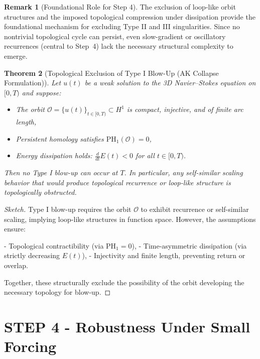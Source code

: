 \documentclass[11pt]{article}
\newtheorem{theorem}{Theorem}[section]
\theoremstyle{definition}
\newtheorem{remark}[theorem]{Remark}
\begin{document}
\begin{remark}[Foundational Role for Step 4]
The exclusion of loop-like orbit structures and the imposed topological compression under dissipation provide the foundational mechanism for excluding Type II and III singularities. Since no nontrivial topological cycle can persist, even slow-gradient or oscillatory recurrences (central to Step~4) lack the necessary structural complexity to emerge.
\end{remark}

\begin{theorem}[Topological Exclusion of Type I Blow-Up (AK Collapse Formulation)]
Let \( u(t) \) be a weak solution to the 3D Navier--Stokes equation on \( [0,T) \) and suppose:

\begin{itemize}
  \item The orbit \( \mathcal{O} = \{ u(t) \}_{t \in [0,T)} \subset H^1 \) is compact, injective, and of finite arc length,
  \item Persistent homology satisfies \( \mathrm{PH}_1(\mathcal{O}) = 0 \),
  \item Energy dissipation holds: \( \frac{d}{dt} E(t) < 0 \) for all \( t \in [0,T) \).
\end{itemize}

Then no Type I blow-up can occur at \( T \). In particular, any self-similar scaling behavior that would produce topological recurrence or loop-like structure is topologically obstructed.
\end{theorem}

\begin{proof}[Sketch]
Type I blow-up requires the orbit \( \mathcal{O} \) to exhibit recurrence or self-similar scaling, implying loop-like structures in function space. However, the assumptions ensure:

- Topological contractibility (via \( \mathrm{PH}_1 = 0 \)),
- Time-asymmetric dissipation (via strictly decreasing \( E(t) \)),
- Injectivity and finite length, preventing return or overlap.

Together, these structurally exclude the possibility of the orbit developing the necessary topology for blow-up.
\end{proof}



\section{STEP 4 - Robustness Under Small Forcing}
\end{document}

